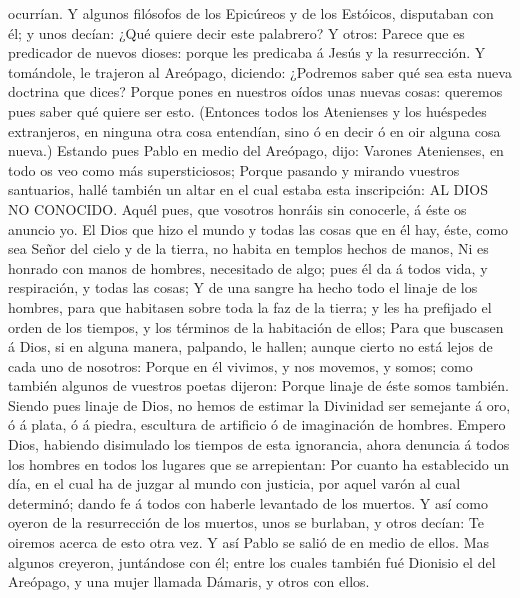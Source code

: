 ocurrían.  Y algunos filósofos de los Epicúreos y de los
Estóicos, disputaban con él; y unos decían: ¿Qué quiere decir este
palabrero? Y otros: Parece que es predicador de nuevos dioses: porque
les predicaba á Jesús y la resurrección.  Y tomándole, le
trajeron al Areópago, diciendo: ¿Podremos saber qué sea esta nueva
doctrina que dices?  Porque pones en nuestros oídos unas
nuevas cosas: queremos pues saber qué quiere ser esto. 
(Entonces todos los Atenienses y los huéspedes extranjeros, en ninguna
otra cosa entendían, sino ó en decir ó en oir alguna cosa nueva.)
 Estando pues Pablo en medio del Areópago, dijo: Varones
Atenienses, en todo os veo como más supersticiosos;  Porque
pasando y mirando vuestros santuarios, hallé también un altar en el cual
estaba esta inscripción: AL DIOS NO CONOCIDO. Aquél pues, que vosotros
honráis sin conocerle, á éste os anuncio yo.  El Dios que
hizo el mundo y todas las cosas que en él hay, éste, como sea Señor del
cielo y de la tierra, no habita en templos hechos de manos,
 Ni es honrado con manos de hombres, necesitado de algo;
pues él da á todos vida, y respiración, y todas las cosas; 
Y de una sangre ha hecho todo el linaje de los hombres, para que
habitasen sobre toda la faz de la tierra; y les ha prefijado el orden de
los tiempos, y los términos de la habitación de ellos; 
Para que buscasen á Dios, si en alguna manera, palpando, le hallen;
aunque cierto no está lejos de cada uno de nosotros: 
Porque en él vivimos, y nos movemos, y somos; como también algunos de
vuestros poetas dijeron: Porque linaje de éste somos también.
 Siendo pues linaje de Dios, no hemos de estimar la
Divinidad ser semejante á oro, ó á plata, ó á piedra, escultura de
artificio ó de imaginación de hombres.  Empero Dios,
habiendo disimulado los tiempos de esta ignorancia, ahora denuncia á
todos los hombres en todos los lugares que se arrepientan: 
Por cuanto ha establecido un día, en el cual ha de juzgar al mundo con
justicia, por aquel varón al cual determinó; dando fe á todos con
haberle levantado de los muertos.  Y así como oyeron de la
resurrección de los muertos, unos se burlaban, y otros decían: Te
oiremos acerca de esto otra vez.  Y así Pablo se salió de
en medio de ellos.  Mas algunos creyeron, juntándose con
él; entre los cuales también fué Dionisio el del Areópago, y una mujer
llamada Dámaris, y otros con ellos.


